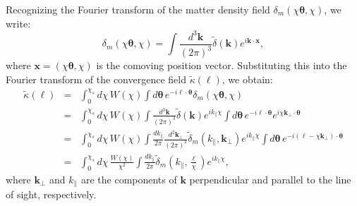 Recognizing the Fourier transform of the matter density field \( \delta_m\left(\chi \boldsymbol{\theta}, \chi\right) \), we write:
\begin{equation}
    \delta_m\left(\chi \boldsymbol{\theta}, \chi\right) = \int \frac{d^3\mathbf{k}}{(2\pi)^3} \tilde{\delta}(\mathbf{k}) e^{i \mathbf{k} \cdot \mathbf{x}},
    \label{eq:delta_m_fourier}
\end{equation}
where \( \mathbf{x} = (\chi \boldsymbol{\theta}, \chi) \) is the comoving position vector. Substituting this into the Fourier transform of the convergence field \( \tilde{\kappa}(\boldsymbol{\ell}) \), we obtain:
\begin{eqnarray}
    \tilde{\kappa}(\boldsymbol{\ell}) &=& \int_0^{\chi_s} d\chi \, W(\chi) \int d\boldsymbol{\theta} \, e^{-i \boldsymbol{\ell} \cdot \boldsymbol{\theta}} \delta_m\left(\chi \boldsymbol{\theta}, \chi\right) \nonumber \\
    &=& \int_0^{\chi_s} d\chi \, W(\chi) \int \frac{d^3\mathbf{k}}{(2\pi)^3} \tilde{\delta}(\mathbf{k}) e^{i k_\parallel \chi} \int d\boldsymbol{\theta} \, e^{-i \boldsymbol{\ell} \cdot \boldsymbol{\theta}} e^{i \chi \mathbf{k}_\perp \cdot \boldsymbol{\theta}} \nonumber \\
    &=& \int_0^{\chi_s} d\chi \, W(\chi) \int \frac{dk_\parallel}{2\pi} \frac{d^2\mathbf{k}_\perp}{(2\pi)^2} \tilde{\delta}_m(k_\parallel, \mathbf{k}_\perp) e^{i k_\parallel \chi} \int d\boldsymbol{\theta} \, e^{-i (\boldsymbol{\ell} - \chi \mathbf{k}_\perp) \cdot \boldsymbol{\theta}} \nonumber \\
    &=& \int_0^{\chi_s} d\chi \, \frac{W(\chi)}{\chi^2} \int \frac{dk_\parallel}{2\pi} \tilde{\delta}_m\left(k_\parallel, \frac{\boldsymbol{\ell}}{\chi}\right) e^{i k_\parallel \chi},
    \label{eq:kappa_fourier_final}
\end{eqnarray}
where \( \mathbf{k}_\perp \) and \( k_\parallel \) are the components of \( \mathbf{k} \) perpendicular and parallel to the line of sight, respectively.

